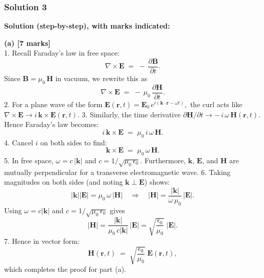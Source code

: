 \documentclass{article}
\begin{document}
\subsubsection{Solution 3}
\noindent
\textbf{Solution (step-by-step), with marks indicated:}

\bigskip
\noindent
\textbf{(a) [7 marks]}\\
1.\; Recall Faraday's law in free space:
\[
\nabla \times \mathbf{E} \;=\; -\,\frac{\partial \mathbf{B}}{\partial t}.
\]
Since \(\mathbf{B} = \mu_0\,\mathbf{H}\) in vacuum, we rewrite this as
\[
\nabla \times \mathbf{E} \;=\; -\,\mu_0\,\frac{\partial \mathbf{H}}{\partial t}.
\]
2.\; For a plane wave of the form
\(\mathbf{E}(\mathbf{r},t) = \mathbf{E}_0 \, e^{i(\mathbf{k}\cdot \mathbf{r} - \omega t)},\)
the curl acts like
\(\nabla \times \mathbf{E} \rightarrow i\,\mathbf{k}\times \mathbf{E}(\mathbf{r},t).\)
3.\; Similarly, the time derivative
\(\partial \mathbf{H}/\partial t \rightarrow -\,i\,\omega\,\mathbf{H}(\mathbf{r},t).\)
Hence Faraday's law becomes:
\[
i\,\mathbf{k}\times \mathbf{E} \;=\; \mu_0 \,i\,\omega \,\mathbf{H}.
\]
4.\; Cancel \(i\) on both sides to find:
\[
\mathbf{k}\times \mathbf{E} \;=\; \mu_0\,\omega \,\mathbf{H}.
\]
5.\; In free space, \(\omega = c\,|\mathbf{k}|\) and \(c = 1/\sqrt{\mu_0\,\epsilon_0}\).
Furthermore, \(\mathbf{k}\), \(\mathbf{E}\), and \(\mathbf{H}\) are mutually perpendicular for a transverse electromagnetic wave.
6.\; Taking magnitudes on both sides (and noting \(\mathbf{k}\perp \mathbf{E}\)) shows:
\[
|\mathbf{k}||\mathbf{E}| = \mu_0\,\omega\,|\mathbf{H}|
\quad\Longrightarrow\quad
|\mathbf{H}| = \frac{|\mathbf{k}|}{\omega\,\mu_0}\,|\mathbf{E}|.
\]
Using \(\omega = c|\mathbf{k}|\) and \(c = 1/\sqrt{\mu_0\,\epsilon_0}\) gives
\[
|\mathbf{H}| 
= \frac{|\mathbf{k}|}{\mu_0\,c|\mathbf{k}|}\,|\mathbf{E}|
= \sqrt{\frac{\epsilon_0}{\mu_0}}\;|\mathbf{E}|.
\]
7.\; Hence in vector form:
\[
\mathbf{H}(\mathbf{r},t) 
\;=\; \sqrt{\frac{\epsilon_0}{\mu_0}}\;\mathbf{E}(\mathbf{r},t),
\]
which completes the proof for part (a).
\end{document}
